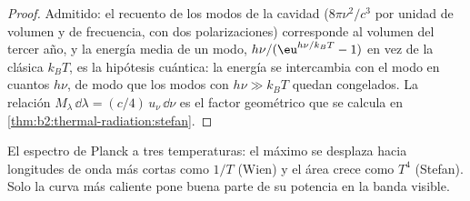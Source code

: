 \begin{proof}
Admitido: el recuento de los modos de la cavidad ($8\pi\nu^2/c^3$ por unidad de
volumen y de frecuencia, con dos polarizaciones) corresponde al volumen del tercer año,
y la energía media de un modo, $h\nu/(\eu^{h\nu/k_BT} - 1)$ en vez de la
clásica $k_BT$, es la hipótesis cuántica: la energía se intercambia con
el modo en cuantos $h\nu$, de modo que los modos con $h\nu \gg k_BT$ quedan
congelados. La relación $M_\lambda\,\dd\lambda = (c/4)\,u_\nu\,\dd\nu$ es el
factor geométrico que se calcula en \cref{thm:b2:thermal-radiation:stefan}.
\end{proof}

\begin{omfigure}

{\small El espectro de Planck a tres temperaturas: el máximo se desplaza hacia
longitudes de onda más cortas como $1/T$ (Wien) y el área crece como $T^4$
(Stefan). Solo la curva más caliente pone buena parte de su potencia en la banda
visible.}
\end{omfigure}

